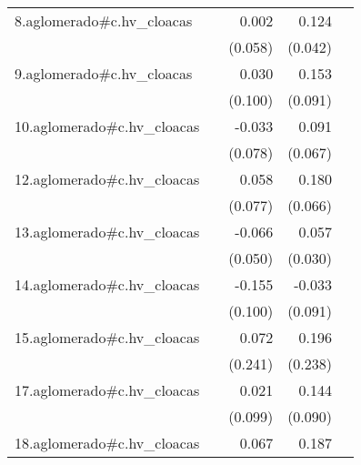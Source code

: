 {\begin{longtable}{l*{4}{D{.}{.}{-1}}}
\addlinespace
8.aglomerado#c.hv\_cloacas&                     &       0.002         &       0.124\sym{**} &                     \\
            &                     &     (0.058)         &     (0.042)         &                     \\
\addlinespace
9.aglomerado#c.hv\_cloacas&                     &       0.030         &       0.153         &                     \\
            &                     &     (0.100)         &     (0.091)         &                     \\
\addlinespace
10.aglomerado#c.hv\_cloacas&                     &      -0.033         &       0.091         &                     \\
            &                     &     (0.078)         &     (0.067)         &                     \\
\addlinespace
12.aglomerado#c.hv\_cloacas&                     &       0.058         &       0.180\sym{**} &                     \\
            &                     &     (0.077)         &     (0.066)         &                     \\
\addlinespace
13.aglomerado#c.hv\_cloacas&                     &      -0.066         &       0.057         &                     \\
            &                     &     (0.050)         &     (0.030)         &                     \\
\addlinespace
14.aglomerado#c.hv\_cloacas&                     &      -0.155         &      -0.033         &                     \\
            &                     &     (0.100)         &     (0.091)         &                     \\
\addlinespace
15.aglomerado#c.hv\_cloacas&                     &       0.072         &       0.196         &                     \\
            &                     &     (0.241)         &     (0.238)         &                     \\
\addlinespace
17.aglomerado#c.hv\_cloacas&                     &       0.021         &       0.144         &                     \\
            &                     &     (0.099)         &     (0.090)         &                     \\
\addlinespace
18.aglomerado#c.hv\_cloacas&                     &       0.067         &       0.187\sym{***}&                     \\

\end{longtable}}
